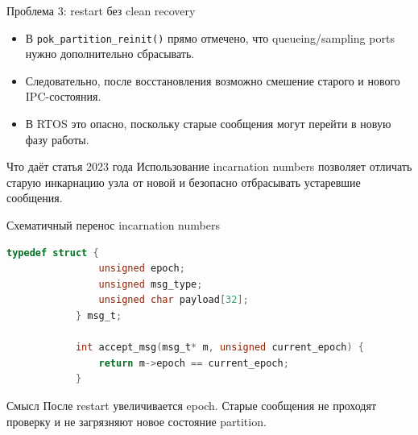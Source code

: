 \documentclass[aspectratio=169]{beamer}
\begin{document}
	\begin{frame}{Проблема 3: restart без clean recovery}
		\begin{itemize}
			\item В \texttt{pok\_partition\_reinit()} прямо отмечено, что queueing/sampling ports нужно дополнительно сбрасывать.
			\item Следовательно, после восстановления возможно смешение старого и нового IPC-состояния.
			\item В RTOS это опасно, поскольку старые сообщения могут перейти в новую фазу работы.
		\end{itemize}
		
		\vspace{0.3cm}
		
		\begin{block}{Что даёт статья 2023 года}
			Использование incarnation numbers позволяет отличать старую инкарнацию узла от новой и безопасно отбрасывать устаревшие сообщения.
		\end{block}
	\end{frame}
	
	\begin{frame}[fragile]{Схематичный перенос incarnation numbers}
		\begin{lstlisting}[language=C]
			typedef struct {
				unsigned epoch;
				unsigned msg_type;
				unsigned char payload[32];
			} msg_t;
			
			int accept_msg(msg_t* m, unsigned current_epoch) {
				return m->epoch == current_epoch;
			}
		\end{lstlisting}
		
		\vspace{0.2cm}
		
		\begin{block}{Смысл}
			После restart увеличивается epoch.
			Старые сообщения не проходят проверку и не загрязняют новое состояние partition.
		\end{block}
	\end{frame}
	
\end{document}
